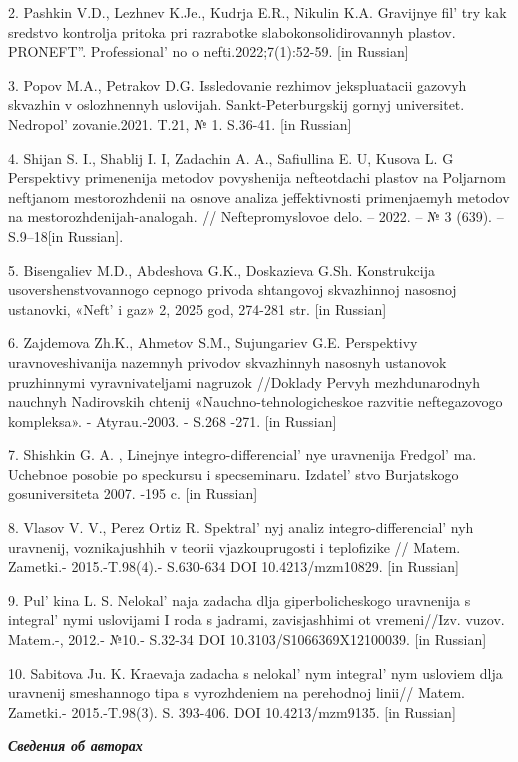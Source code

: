 2. Pashkin V.D., Lezhnev K.Je., Kudrja E.R., Nikulin K.A. Gravijnye
fil' try kak sredstvo kontrolja pritoka pri razrabotke
slabokonsolidirovannyh plastov. PRONEFT''.
Professional' no o nefti.2022;7(1):52-59. {[}in
Russian{]}

3. Popov M.A., Petrakov D.G. Issledovanie rezhimov jekspluatacii gazovyh
skvazhin v oslozhnennyh uslovijah. Sankt-Peterburgskij gornyj
universitet. Nedropol' zovanie.2021. T.21, № 1.
S.36-41. {[}in Russian{]}

4. Shijan S. I., Shablij I. I, Zadachin A. A., Safiullina E. U, Kusova
L. G Perspektivy primenenija metodov povyshenija nefteotdachi plastov na
Poljarnom neftjanom mestorozhdenii na osnove analiza jeffektivnosti
primenjaemyh metodov na mestorozhdenijah-analogah. // Neftepromyslovoe
delo. -- 2022. -- № 3 (639). -- S.9--18{[}in Russian{]}.

5. Bisengaliev M.D., Abdeshova G.K., Doskazieva G.Sh. Konstrukcija
usovershenstvovannogo cepnogo privoda shtangovoj skvazhinnoj nasosnoj
ustanovki, «Neft'{} i gaz» 2, 2025 god, 274-281 str.
{[}in Russian{]}

6. Zajdemova Zh.K., Ahmetov S.M., Sujungariev G.E. Perspektivy
uravnoveshivanija nazemnyh privodov skvazhinnyh nasosnyh ustanovok
pruzhinnymi vyravnivateljami nagruzok //Doklady Pervyh mezhdunarodnyh
nauchnyh Nadirovskih chtenij «Nauchno-tehnologicheskoe razvitie
neftegazovogo kompleksa». - Atyrau.-2003. - S.268 -271. {[}in
Russian{]}

7. Shishkin G. A. , Linejnye integro-differencial' nye
uravnenija Fredgol' ma. Uchebnoe posobie po speckursu i
specseminaru. Izdatel' stvo Burjatskogo gosuniversiteta
2007. -195 c. {[}in Russian{]}

8. Vlasov V. V., Perez Ortiz R. Spektral' nyj analiz
integro-differencial' nyh uravnenij, voznikajushhih v
teorii vjazkouprugosti i teplofizike // Matem. Zametki.- 2015.-T.98(4).-
S.630-634 DOI 10.4213/mzm10829. {[}in Russian{]}

9. Pul' kina L. S. Nelokal' naja zadacha
dlja giperbolicheskogo uravnenija s integral' nymi
uslovijami I roda s jadrami, zavisjashhimi ot vremeni//Izv. vuzov.
Matem.-, 2012.- №10.- S.32-34 DOI 10.3103/S1066369X12100039. {[}in
Russian{]}

10. Sabitova Ju. K. Kraevaja zadacha s nelokal' nym
integral' nym usloviem dlja uravnenij smeshannogo tipa s
vyrozhdeniem na perehodnoj linii// Matem. Zametki.- 2015.-T.98(3). S.
393-406. DOI 10.4213/mzm9135. {[}in Russian{]}

\emph{{\bfseries Сведения об авторах}}

